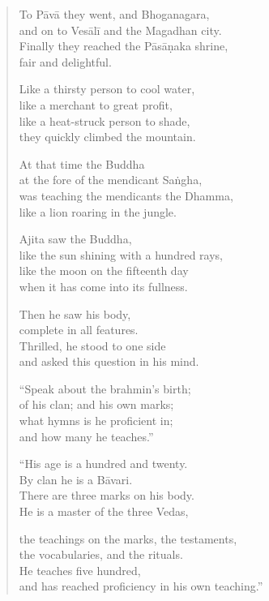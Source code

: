 \documentclass[12pt,openany]{book}%
\begin{document}
\begin{verse}
To \textsanskrit{Pāvā} they went, and Bhoganagara, \\
and on to \textsanskrit{Vesālī} and the Magadhan city. \\
Finally they reached the \textsanskrit{Pāsāṇaka} shrine, \\
fair and delightful. 

Like a thirsty person to cool water, \\
like a merchant to great profit, \\
like a heat-struck person to shade, \\
they quickly climbed the mountain. 

At that time the Buddha \\
at the fore of the mendicant \textsanskrit{Saṅgha}, \\
was teaching the mendicants the Dhamma, \\
like a lion roaring in the jungle. 

Ajita saw the Buddha, \\
like the sun shining with a hundred rays, \\
like the moon on the fifteenth day \\
when it has come into its fullness. 

Then he saw his body, \\
complete in all features. \\
Thrilled, he stood to one side \\
and asked this question in his mind. 

“Speak about the brahmin’s birth; \\
of his clan; and his own marks; \\
what hymns is he proficient in; \\
and how many he teaches.” 

“His age is a hundred and twenty. \\
By clan he is a \textsanskrit{Bāvari}. \\
There are three marks on his body. \\
He is a master of the three Vedas, 

the teachings on the marks, the testaments, \\
the vocabularies, and the rituals. \\
He teaches five hundred, \\
and has reached proficiency in his own teaching.” 


\end{verse}
\end{document}
